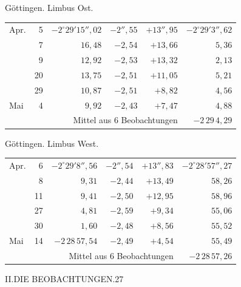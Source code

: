 \noindent\begin{minipage}[t]{.495\textwidth}\centering Göttingen. Limbus Ost.\par\smallskip
{\scriptsize\setlength{\tabcolsep}{1pt}\renewcommand{\arraystretch}{1.2}\begin{tabular}{lr|r|r|r|r|}
Apr.&5&$-2^\circ29'15''{,}02$&$-2''{,}55$&$+13''{,}95$&$-2^\circ29'3''{,}62$\\
&7&$16{,}48$&$-2{,}54$&$+13{,}66$&$5{,}36$\\
&9&$12{,}92$&$-2{,}53$&$+13{,}32$&$2{,}13$\\
&20&$13{,}75$&$-2{,}51$&$+11{,}05$&$5{,}21$\\
&29&$10{,}87$&$-2{,}51$&$+8{,}82$&$4{,}56$\\
Mai&4&$9{,}92$&$-2{,}43$&$+7{,}47$&$4{,}88$\\
\cline{6-6}\multicolumn{5}{r}{Mittel aus 6 Beobachtungen}&$-2\,29\,4{,}29$
\end{tabular}}\end{minipage}\hfill\begin{minipage}[t]{.495\textwidth}\centering Göttingen. Limbus West.\par\smallskip
{\scriptsize\setlength{\tabcolsep}{1pt}\renewcommand{\arraystretch}{1.2}\begin{tabular}{lr|r|r|r|r}
Apr.&6&$-2^\circ29'8''{,}56$&$-2''{,}54$&$+13''{,}83$&$-2^\circ28'57''{,}27$\\
&8&$9{,}31$&$-2{,}44$&$+13{,}49$&$58{,}26$\\
&11&$9{,}41$&$-2{,}50$&$+12{,}95$&$58{,}96$\\
&27&$4{,}81$&$-2{,}59$&$+9{,}34$&$55{,}06$\\
&30&$1{,}60$&$-2{,}48$&$+8{,}56$&$55{,}52$\\
Mai&14&$-2\,28\,57{,}54$&$-2{,}49$&$+4{,}54$&$55{,}49$\\
\cline{6-6}\multicolumn{5}{r}{Mittel aus 6 Beobachtungen}&$-2\,28\,57{,}26$
\end{tabular}}\end{minipage}
\par\vspace{4mm}

\clearpage
\noindent\mbox{}\hfill II.\quad DIE BEOBACHTUNGEN.\hfill 27\par

